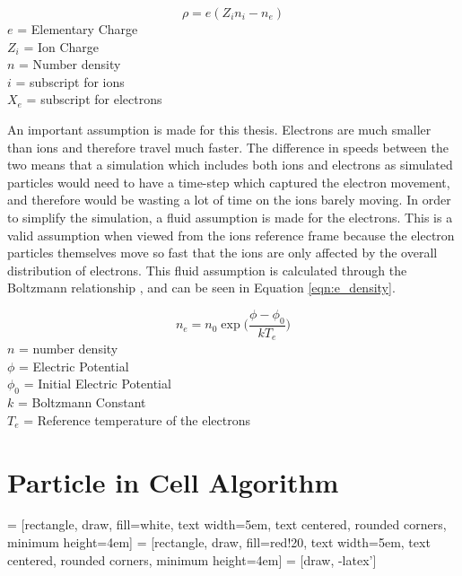 \begin{equation}
    \label{eqn:density}
    \rho = e(Z_i n_i - n_e)
\end{equation}
\(e\) = Elementary Charge \\
\(Z_i\) = Ion Charge \\
\(n\) = Number density \\
\(i\) = subscript for ions \\
\(X_e\) = subscript for electrons \par

An important assumption is made for this thesis. Electrons are much smaller than ions and therefore travel much faster. The difference in speeds between the two means that a simulation which includes both ions and electrons as simulated particles would need to have a time-step which captured the electron movement, and therefore would be wasting a lot of time on the ions barely moving. In order to simplify the simulation, a fluid assumption is made for the electrons. This is a valid assumption when viewed from the ions reference frame because the electron particles themselves move so fast that the ions are only affected by the overall distribution of electrons. This fluid assumption is calculated through the Boltzmann relationship \cite{es-pic}, and can be seen in Equation \ref{eqn:e_density}.


\begin{equation}
    \label{eqn:e_density}
    n_e = n_0 \exp\Big(\frac{\phi - \phi_0}{k T_e}\Big)
\end{equation}
\(n\) = number density \\
\(\phi\) = Electric Potential \\
\(\phi_0\) = Initial Electric Potential \\
\(k\) = Boltzmann Constant \\
\(T_e\) = Reference temperature of the electrons \par



\section{Particle in Cell Algorithm}
\label{sec:algorithm}

 = [rectangle, draw, fill=white, 
    text width=5em, text centered, rounded corners, minimum height=4em]
 = [rectangle, draw, fill=red!20, 
    text width=5em, text centered, rounded corners, minimum height=4em]
 = [draw, -latex']

